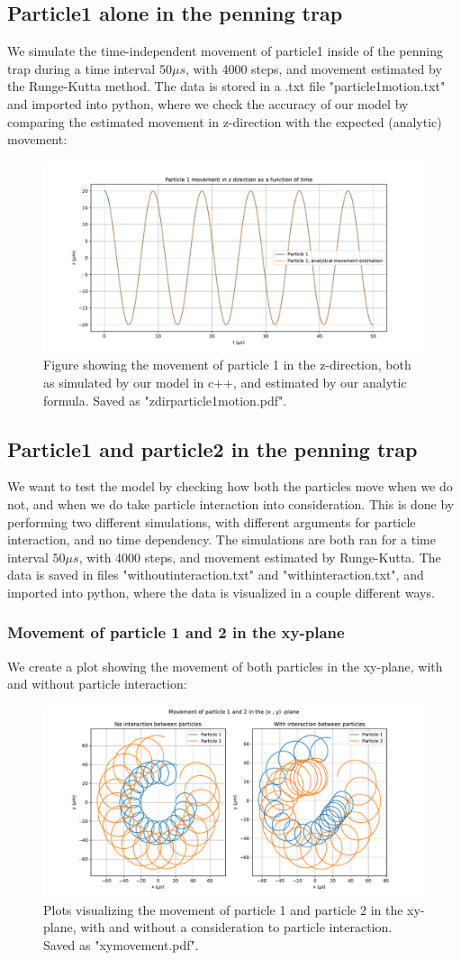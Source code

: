 \documentclass[english,notitlepage,reprint,nofootinbib,twocolumn]{article}
\begin{document}
\subsection{Particle1 alone in the penning trap}
We simulate the time-independent movement of particle1 inside of the penning trap during a time interval $50 \mu s$, with 4000 steps, and movement estimated by the Runge-Kutta method. The data is stored in a .txt file "particle1motion.txt" and imported into python, where we check the accuracy of our model by comparing the estimated movement in z-direction with the expected (analytic) movement:
\begin{figure}[H]
    \centering
    \includegraphics[width = .45\textwidth]{zdir_particle1motion.pdf} 
    \caption{Figure showing the movement of particle 1 in the z-direction, both as simulated by our model in c++, and estimated by our analytic formula. Saved as "zdir\textunderscore particle1motion.pdf".}
    \label{fig: ee251}
\end{figure}

\subsection{Particle1 and particle2 in the penning trap}
We want to test the model by checking how both the particles move when we do not, and when we do take particle interaction into consideration. This is done by performing two different simulations, with different arguments for particle interaction, and no time dependency. The simulations are both ran for a time interval $50 \mu s$, with 4000 steps, and movement estimated by Runge-Kutta. The data is saved in files "withoutinteraction.txt" and "withinteraction.txt", and imported into python, where the data is visualized in a couple different ways. 

\subsubsection{Movement of particle 1 and 2 in the xy-plane}
We create a plot showing the movement of both particles in the xy-plane, with and without particle interaction: 
\begin{figure}[H]
    \centering
    \includegraphics[width = .45\textwidth]{xy_movement.pdf} 
    \caption{Plots visualizing the movement of particle 1 and particle 2 in the xy-plane, with and without a consideration to particle interaction. Saved as "xy\textunderscore movement.pdf".}
    \label{fig: ee251}
\end{figure} 
\end{document}
